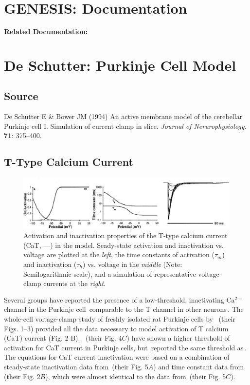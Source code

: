 \documentclass[12pt]{article}
\begin{document}
\section*{GENESIS: Documentation}

{\bf Related Documentation:}

\section*{De Schutter: Purkinje Cell Model}

\subsection*{Source}

De Schutter E \& Bower JM (1994) An active membrane model of the cerebellar Purkinje cell I. Simulation of current clamp in slice. {\it Journal of Nerurophysiology}. {\bf 71}: 375--400. \\

\subsection*{T-Type Calcium Current}

\begin{figure}[h]
\centering
   \includegraphics[scale=0.75]{figures/DS1.2B.eps}
   \caption{Activation and inactivation properties of the T-type calcium current (CaT, ---) in the model. Seady-state activation and inactivation vs. voltage are plotted at the {\em left}, the time constants of activation ($\tau_m$) and inactivation ($\tau_h$) vs. voltage in the {\em middle} (Note: Semilogarithmic scale), and a simulation of representative voltage-clamp currents at the {\em right}.}
   \label{fig:DS1.2B}
\end{figure}

Several groups have reported the presence of a low-threshold, inactivating Ca$^{2+}$ channel in the Purkinje
cell\,\cite{Gruol:1990vn, Hirano:1989uq, Kaneda:1990ys} comparable to the T channel in other neurons\,\cite{Fox:1987zr}. The whole-cell voltage-clamp study of freshly isolated rat Purkinje cells by \,\cite{Kaneda:1990ys} (their Figs. 1--3) provided all the data necessary to model activation of T calcium (CaT) current (Fig. 2 B). \,\cite{Hirano:1989uq} (their Fig. 4$C$) have shown a higher threshold of activation for CaT current in Purkinje cells, but\,\cite{Gruol:1990vn} reported the same threshold as\,\cite{Kaneda:1990ys}. The equations for CaT current inactivation were based on a combination of steady-state inactivation data from\,\cite{Hirano:1989uq} (their Fig. 5$A$) and time constant data from\,\cite{Kaneda:1990ys} (their Fig. 2$B$), which were almost identical to the data from\,\cite{Hirano:1989uq} (their Fig. 5$C$).



\end{document}
